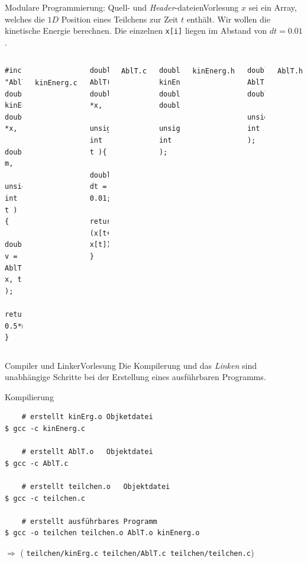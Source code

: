 \documentclass[xcolor=dvipsnames]{beamer}
\newcounter{lecturecounter}
\begin{document}
\begin{frame}[fragile]{Modulare Programmierung: Quell- und \emph{Header}-dateien}{Vorlesung }
\small $x$ sei ein Array, welches die $1D$ Position eines Teilchens zur Zeit $t$ enthält. Wir wollen die kinetische Energie berechnen. Die einzelnen \texttt{x[i]} liegen im Abstand von $dt=0.01$.
\begin{columns}[T]
    \begin{lstlisting}
#include "AblT.h"
double 
kinEnerg( double *x, 
          double m, 
          unsigned int t ) {
  double v = AblT( x, t );
  return 0.5*m*v*v;
}
    \end{lstlisting}
    \\ \texttt{kinEnerg.c}
    \vspace{0.1cm}
    \begin{lstlisting}
double AblT( double *x, 
             unsigned int t ){
  double dt = 0.01;
  return (x[t+1]-x[t])/dt;
}
    \end{lstlisting}
    \texttt{AblT.c}
    \begin{lstlisting}
double kinEnerg( double*, double,
                 unsigned int );
    \end{lstlisting}
    \texttt{kinEnerg.h}
    \vspace{2.4cm}
    \begin{lstlisting}
double AblT( double*, 
             unsigned int );
    \end{lstlisting}
    \texttt{AblT.h}  
  \end{columns}
\end{frame}

\begin{frame}[fragile]{Compiler und Linker}{Vorlesung }
  Die Kompilerung und das \emph{Linken} sind unabhängige Schritte bei der Erstellung eines ausführbaren Programms.
\begin{block}{Kompilierung}
  \begin{verbatim}
    # erstellt kinErg.o Objketdatei
$ gcc -c kinEnerg.c

    # erstellt AblT.o   Objektdatei
$ gcc -c AblT.c       

    # erstellt teilchen.o   Objektdatei
$ gcc -c teilchen.c       

    # erstellt ausführbares Programm
$ gcc -o teilchen teilchen.o AblT.o kinEnerg.o 
  \end{verbatim}
\end{block}
$\Rightarrow$ ( \verb|teilchen/kinErg.c teilchen/AblT.c teilchen/teilchen.c|)
\end{frame}
\end{document}
